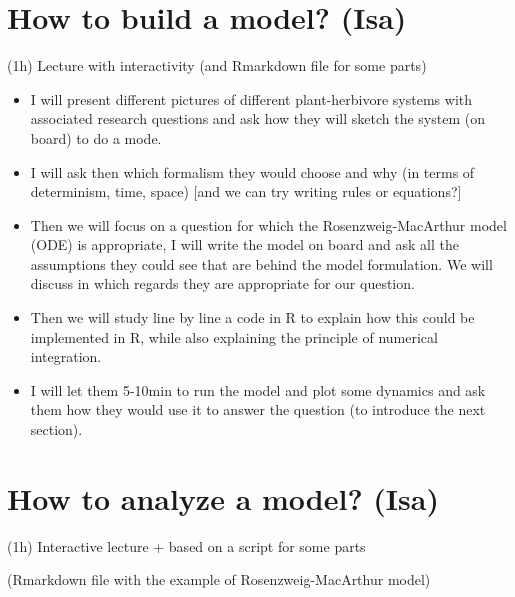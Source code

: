 \documentclass[
]{book}
\providecommand{\tightlist}{%
  \setlength{\itemsep}{0pt}\setlength{\parskip}{0pt}}
\theoremstyle{definition}
\theoremstyle{definition}
\theoremstyle{definition}
\theoremstyle{definition}
\theoremstyle{remark}
\begin{document}
\chapter{How to build a model? (Isa)}\label{how-to-build-a-model-isa}

(1h) Lecture with interactivity (and Rmarkdown file for some parts)

\begin{itemize}
\tightlist
\item
  I will present different pictures of different plant-herbivore systems with associated research questions and ask how they will sketch the system (on board) to do a mode.
\item
  I will ask then which formalism they would choose and why (in terms of determinism, time, space) {[}and we can try writing rules or equations?{]}
\item
  Then we will focus on a question for which the Rosenzweig-MacArthur model (ODE) is appropriate, I will write the model on board and ask all the assumptions they could see that are behind the model formulation. We will discuss in which regards they are appropriate for our question.
\item
  Then we will study line by line a code in R to explain how this could be implemented in R, while also explaining the principle of numerical integration.
\item
  I will let them 5-10min to run the model and plot some dynamics and ask them how they would use it to answer the question (to introduce the next section).
\end{itemize}

\chapter{How to analyze a model? (Isa)}\label{how-to-analyze-a-model-isa}

(1h) Interactive lecture + based on a script for some parts

(Rmarkdown file with the example of Rosenzweig-MacArthur model)
\end{document}
